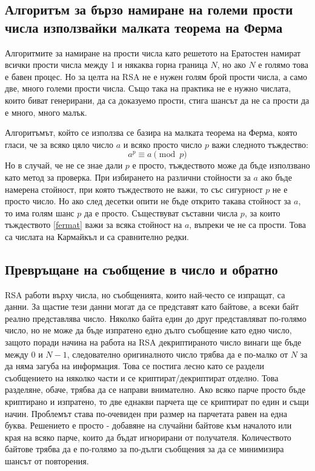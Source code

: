   \subsection{Алгоритъм за бързо намиране на големи прости числа използвайки малката теорема на Ферма} \label{primesalgo}
  Алгоритмите за намиране на прости числа като решетото на Ератостен\cite{primesieve} намират всички прости числа между 1 и някаква горна граница $N$, но ако $N$ е голямо това е бавен процес. Но за целта на RSA не е нужен голям брой прости числа, а само две, много големи прости числа. Също така на практика не е нужно числата, които биват генерирани, да са доказуемо прости, стига шансът да не са прости да е много, много малък.

  Алгоритъмът, който се използва се базира на малката теорема на Ферма, която гласи, че за всяко цяло число $a$ и всяко просто число $p$ важи следното тъждество:
  \begin{equation}
    a^p \equiv a \pmod{p}
    \label{fermat}
  \end{equation}
  Но в случай, че не се знае дали $p$ е просто, тъждеството може да бъде използвано като метод за проверка. При избирането на различни стойности за $a$ ако бъде намерена стойност, при която тъждеството не важи, то със сигурност $p$ не е просто число. Но ако след десетки опити не бъде открито такава стойност за $a$, то има голям шанс $p$ да е просто.
  Съществуват съставни числа $p$, за които тъждеството \ref{fermat} важи за всяка стойност на $a$, въпреки че не са прости. Това са числата на Кармайкъл и са сравнително редки.\cite{carmichaelrare} %

  \subsection{Превръщане на съобщение в число и обратно} \label{paddingscheme}
  RSA работи върху числа, но съобщенията, които най-често се изпращат, са данни. За щастие тези данни могат да се представят като байтове, а всеки байт реално представлява число. Няколко байта един до друг представляват по-голямо число, но не може да бъде изпратено едно дълго съобщение като едно число, защото поради начина на работа на RSA декриптираното число винаги ще бъде между $0$ и $N-1$, следователно оригиналното число трябва да е по-малко от $N$ за да няма загуба на информация. Това се постига лесно като се раздели съобщението на няколко части и се криптират/декриптират отделно. Това разделяне, обаче, трябва да се направи внимателно. Ако всяко парче просто бъде криптирано и изпратено, то две еднакви парчета ще се криптират по един и същи начин. Проблемът става по-очевиден при размер на парчетата равен на една буква. Решението е просто - добавяне на случайни байтове към началото или края на всяко парче, които да бъдат игнорирани от получателя. Количеството байтове трябва да е по-голямо за по-дълги съобщения за да се минимизира шансът от повторения.

